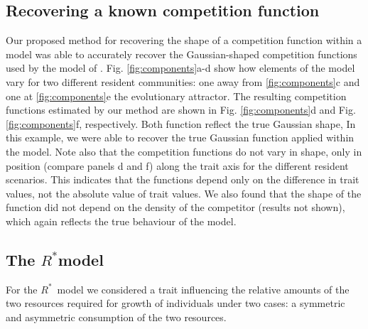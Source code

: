 \documentclass[a4paper,11pt]{article}
\newcommand{\Rstar}{\ensuremath{R^*}}
\begin{document}
\subsection{Recovering a known competition function}

Our proposed method for recovering the shape of a competition function within a model was able to accurately recover the Gaussian-shaped competition functions used by the model of \citet{Dieckmann-1999}. Fig. \ref{fig:components}a-d show how elements of the model vary for two different resident communities: one away from \ref{fig:components}c and one at \ref{fig:components}e the evolutionary attractor. The resulting competition functions estimated by our method are shown in Fig. \ref{fig:components}d and Fig. \ref{fig:components}f, respectively. Both function reflect the true Gaussian shape, In this example, we were able to recover the true Gaussian function applied within the model. Note also that the competition functions do not vary in shape, only in position (compare panels d and f) along the trait axis for the different resident scenarios. This indicates that the functions depend only on the difference in trait values, not the absolute value of trait values. We also found that the shape of the function did not depend on the density of the competitor (results not shown), which again reflects the true behaviour of the model.

\subsection{The \Rstar model}

For the \Rstar\ model we considered a trait influencing the relative amounts of the two resources required for growth of individuals under two cases: a symmetric and asymmetric consumption of the two resources.
\end{document}
